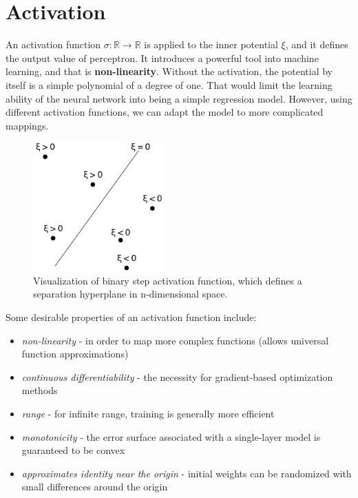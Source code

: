 \section{Activation}

An activation function $\sigma: \mathbb{R} \rightarrow \mathbb{R}$ is applied to the inner potential $\xi$, and it defines the output value of perceptron. It introduces a powerful tool into machine learning, and that is \textbf{non-linearity}. Without the activation, the potential by itself is a simple polynomial of a degree of one. That would limit the learning ability of the neural network into being a simple regression model. However, using different activation functions, we can adapt the model to more complicated mappings.

\begin{figure}[h]

\centering
\includegraphics[width=0.45\textwidth]{tex/images/activation-vis}
\caption{Visualization of binary step activation function, which defines a separation hyperplane in n-dimensional space.}
\end{figure}

\noindent
Some desirable properties \cite{wiki:activation} of an activation function include:

\begin{itemize}

\item \textit{non-linearity} - in order to map more complex functions (allows universal function approximations)
\item \textit{continuous differentiability} - the necessity for gradient-based optimization methods
\item \textit{range} - for infinite range, training is generally more efficient
\item \textit{monotonicity} - the error surface associated with a single-layer model is guaranteed to be convex
\item \textit{approximates identity near the origin} - initial weights can be randomized with small differences around the origin

\end{itemize}

